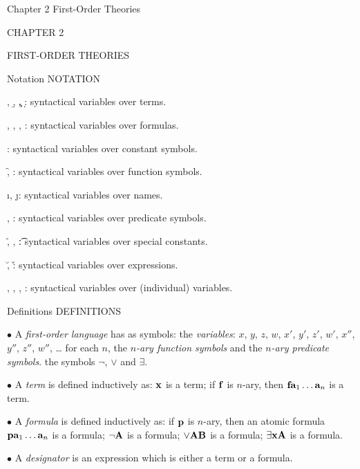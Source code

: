  {Chapter 2 First-Order Theories}
\centerline{\xmplbxi CHAPTER 2}
\medskip
\centerline{\xmplbx FIRST-ORDER THEORIES}
\bigskip

 {Notation}
\beginsection NOTATION

{\leftskip 1in
\item{\a, \b, \c, \d:} syntactical variables over terms.
\item{\A, \B, \C, \D:} syntactical variables over formulas.
\item{\e:} syntactical variables over constant symbols.
\item{\f, \g:} syntactical variables over function symbols.
\item{\i, \j:} syntactical variables over names.
\item{\p, \q:} syntactical variables over predicate symbols.
\item{\r, \s, \t:} syntactical variables over special constants.
\item{\u, \v:} syntactical variables over expressions.
\item{\x, \y, \z, \w:} syntactical variables over (individual) variables.
\par}

 {Definitions}
\beginsection DEFINITIONS

\item{$\bullet$} A {\it first-order language} has as symbols:
 the {\it variables}: $x$, $y$, $z$, $w$, $x'$, $y'$, $z'$, $w'$, $x''$, $y''$, $z''$, $w''$, \dots
{} for each $n$, the $n${\it-ary function symbols} and the $n${\it-ary predicate symbols}.
 the symbols $\neg$, $\lor$ and $\exists$.
\smallskip

\item{$\bullet$} A {\it term} is defined inductively as:
 ${\bf x}$ is a term;
 if ${\bf f}$ is $n$-ary, then ${\bf f}{\bf a}_1 \dots {\bf a}_n$ is a term.
\smallskip

\item{$\bullet$} A {\it formula} is defined inductively as:
 if ${\bf p}$ is $n$-ary, then an atomic formula ${\bf p}{\bf a}_1 \dots {\bf a}_n$ is a formula;
 $\neg {\bf A}$ is a formula;
 $\lor{\bf A}{\bf B}$ is a formula;
 $\exists {\bf x}{\bf A}$ is a formula.
\smallskip

\item{$\bullet$} A {\it designator} is an expression which is either a term or a formula.
\smallskip

